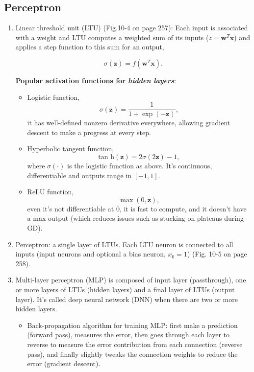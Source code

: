 \documentclass[12pt,oneside,a4paper]{article}
\numberwithin{equation}{section}
\newcommand{\bfw}{\boldsymbol{w}}
\newcommand{\bfx}{\boldsymbol{x}}
\newcommand{\bfz}{\boldsymbol{z}}
\begin{document}
\subsection{Perceptron}
\begin{enumerate}
\item Linear threshold unit (LTU) (Fig.10-4 on page 257): Each input is associated with a weight and LTU computes a weighted sum of its inputs ($z = \bfw^T \bfx$) and applies a step function to this sum for an output, 

\begin{equation}
\sigma(\bfz) = f(\bfw^T \bfx).
\end{equation}

\textbf{Popular activation functions for \textit{hidden layers}}:
\begin{itemize}
\item Logistic function, 
\begin{equation}
\sigma(\bfz) = \frac{1}{1 + \exp(-\bfz)},
\end{equation}
it has well-defined nonzero derivative everywhere, allowing gradient descent to make a progress at every step.

\item Hyperbolic tangent function, 
\begin{equation}
\textrm{tan h} (\bfz) = 2 \sigma(2 \bfz) - 1,
\end{equation}
where $\sigma(\cdot)$ is the logistic function as above. It's continuous, differentiable and outputs range in $[-1, 1]$.

\item ReLU function,
\begin{equation}
\max (0, \bfz),
\end{equation} 
even it's not differentiable at 0, it is fast to compute, and it doesn't have a max output (which reduces issues such as stucking on plateaus during GD).
\end{itemize}

\item Perceptron: a single layer of LTUs. Each LTU neuron is connected to all inputs (input neurons and optional a bias neuron, $x_0 = 1$) (Fig. 10-5 on page 258). 

\item Multi-layer perceptron (MLP) is composed of input layer (passthrough), one or more layers of LTUs (hidden layers) and a final layer of LTUs (output layer). It's called deep neural network (DNN) when there are two or more hidden layers.

\begin{itemize}
\item Back-propagation algorithm for training MLP: first make a prediction (forward pass), measures the error, then goes through each layer to reverse to measure the error contribution from each connection (reverse pass), and finally slightly tweaks the connection weights to reduce the error (gradient descent). 
\end{itemize}
\end{enumerate}
\end{document}
